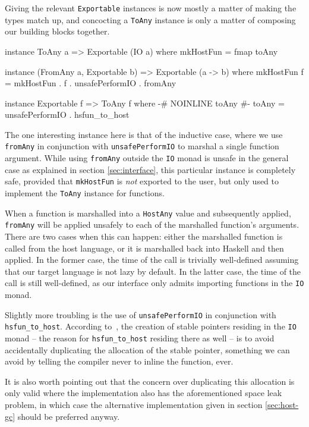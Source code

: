 \documentclass[preprint]{sigplanconf}
\begin{document}
Giving the relevant \lstinline!Exportable! instances is now mostly a matter of
making the types match up, and concocting a \lstinline!ToAny! instance is only
a matter of composing our building blocks together.

\begin{code}
instance ToAny a => Exportable (IO a) where
  mkHostFun = fmap toAny

instance (FromAny a, Exportable b) =>
          Exportable (a -> b) where
  mkHostFun f =
    mkHostFun . f . unsafePerformIO . fromAny
  
instance Exportable f => ToAny f where
  {-# NOINLINE toAny #-}
  toAny = unsafePerformIO . hsfun_to_host
\end{code}

The one interesting instance here is that of the inductive case, where we use
\lstinline!fromAny! in conjunction with \lstinline!unsafePerformIO! to marshal
a single function argument. While using \lstinline!fromAny! outside the
\lstinline!IO! monad is unsafe in the general case as explained in section
\ref{sec:interface}, this particular instance is completely safe, provided that
\lstinline!mkHostFun! is \emph{not} exported to the user, but only used to
implement the \lstinline!ToAny! instance for functions.

When a function is marshalled into a \lstinline!HostAny! value and subsequently
applied, \lstinline!fromAny! will be applied unsafely to each of the
marshalled function's arguments. There are two cases
when this can happen: either the marshalled function is called from the host
language, or it is marshalled back into Haskell and then applied.
In the former case, the time of the call is trivially well-defined assuming
that our target language is not lazy by default.
In the latter case, the time of the call is still well-defined, as our
interface only admits importing functions in the \lstinline!IO! monad.

Slightly more troubling is the use of \lstinline!unsafePerformIO! in
conjunction with \lstinline!hsfun_to_host!.
According to\ \cite{stableptr}, the creation of stable pointers residing in
the \lstinline!IO! monad -- the reason for \lstinline!hsfun_to_host! residing
there as well -- is to avoid accidentally duplicating the allocation of the
stable pointer, something we can avoid by telling the compiler never to
inline the function, ever.

It is also worth pointing out that the concern over duplicating this allocation
is only valid where the implementation also has the aforementioned space leak
problem, in which case the alternative implementation given in section
\ref{sec:host-gc} should be preferred anyway.
\end{document}
